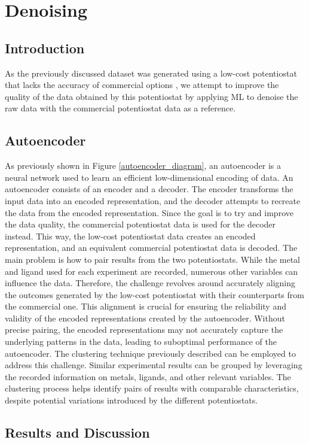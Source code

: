 \chapter{Denoising} \label{chap:chap-4}

\section{Introduction}
As the previously discussed dataset was generated using a low-cost potentiostat that lacks the accuracy of commercial options \cite{PabloGarca2024}, we attempt to improve the quality of the data obtained by this potentiostat by applying ML to denoise the raw data with the commercial potentiostat data as a reference.
\section{Autoencoder}
As previously shown in Figure \ref{autoencoder_diagram}, an autoencoder is a neural network used to learn an efficient low-dimensional encoding of data. An autoencoder consists of an encoder and a decoder. The encoder transforms the input data into an encoded representation, and the decoder attempts to recreate the data from the encoded representation. Since the goal is to try and improve the data quality, the commercial potentiostat data is used for the decoder instead. This way, the low-cost potentiostat data creates an encoded representation, and an equivalent commercial potentiostat data is decoded. The main problem is how to pair results from the two potentiostats. While the metal and ligand used for each experiment are recorded, numerous other variables can influence the data. Therefore, the challenge revolves around accurately aligning the outcomes generated by the low-cost potentiostat with their counterparts from the commercial one. This alignment is crucial for ensuring the reliability and validity of the encoded representations created by the autoencoder. Without precise pairing, the encoded representations may not accurately capture the underlying patterns in the data, leading to suboptimal performance of the autoencoder. The clustering technique previously described can be employed to address this challenge. Similar experimental results can be grouped by leveraging the recorded information on metals, ligands, and other relevant variables. The clustering process helps identify pairs of results with comparable characteristics, despite potential variations introduced by the different potentiostats.
\section{Results and Discussion}

